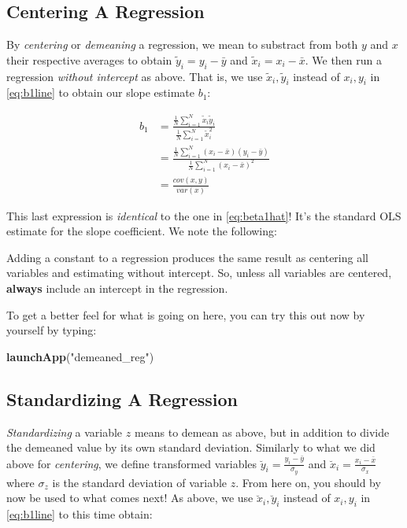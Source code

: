 \documentclass[]{book}
\newenvironment{Shaded}{\begin{snugshade}}{\end{snugshade}}
\newcommand{\KeywordTok}[1]{\textcolor[rgb]{0.13,0.29,0.53}{\textbf{#1}}}
\newcommand{\StringTok}[1]{\textcolor[rgb]{0.31,0.60,0.02}{#1}}
\newcommand{\NormalTok}[1]{#1}
\newenvironment{tip}{\begin{tcolorbox}[colback=green!5!white,colframe=green,title=\textbf{Tip:}]}{\end{tcolorbox}}
\theoremstyle{definition}
\theoremstyle{definition}
\theoremstyle{definition}
\theoremstyle{remark}
\begin{document}
\subsection{Centering A Regression}\label{centering-a-regression}

By \emph{centering} or \emph{demeaning} a regression, we mean to
substract from both \(y\) and \(x\) their respective averages to obtain
\(\tilde{y}_i = y_i - \bar{y}\) and \(\tilde{x}_i = x_i - \bar{x}\). We
then run a regression \emph{without intercept} as above. That is, we use
\(\tilde{x}_i,\tilde{y}_i\) instead of \(x_i,y_i\) in \eqref{eq:b1line} to
obtain our slope estimate \(b_1\):

\begin{align}
b_1 &= \frac{\frac{1}{N}\sum_{i=1}^N \tilde{x}_i \tilde{y}_i}{\frac{1}{N}\sum_{i=1}^N \tilde{x}_i^2}\\
    &= \frac{\frac{1}{N}\sum_{i=1}^N (x_i - \bar{x}) (y_i - \bar{y})}{\frac{1}{N}\sum_{i=1}^N (x_i - \bar{x})^2} \\
    &= \frac{cov(x,y)}{var(x)}
    \label{eq:bline-centered}
\end{align}

This last expression is \emph{identical} to the one in
\eqref{eq:beta1hat}! It's the standard OLS estimate for the slope
coefficient. We note the following:

\begin{tip}
Adding a constant to a regression produces the same result as centering
all variables and estimating without intercept. So, unless all variables
are centered, \textbf{always} include an intercept in the regression.
\end{tip}

 To get a better feel for what is going on here, you can try this out
now by yourself by typing:

\begin{Shaded}
\begin{Highlighting}[]
\KeywordTok{launchApp}\NormalTok{(}\StringTok{"demeaned_reg"}\NormalTok{)}
\end{Highlighting}
\end{Shaded}

\subsection{Standardizing A
Regression}\label{standardizing-a-regression}

\emph{Standardizing} a variable \(z\) means to demean as above, but in
addition to divide the demeaned value by its own standard deviation.
Similarly to what we did above for \emph{centering}, we define
transformed variables \(\breve{y}_i = \frac{y_i-\bar{y}}{\sigma_y}\) and
\(\breve{x}_i = \frac{x_i-\bar{x}}{\sigma_x}\) where \(\sigma_z\) is the
standard deviation of variable \(z\). From here on, you should by now be
used to what comes next! As above, we use \(\breve{x}_i,\breve{y}_i\)
instead of \(x_i,y_i\) in \eqref{eq:b1line} to this time obtain:
\end{document}
